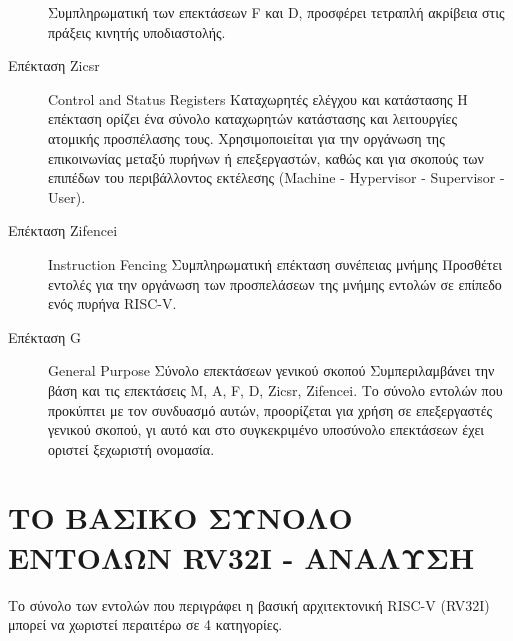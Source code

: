 \documentclass[11pt]{extarticle}
\let\stdsection\section
\renewcommand\section{\newpage\stdsection}
\begin{document}
\begin{description}
Συμπληρωματική των επεκτάσεων F και D, προσφέρει τετραπλή ακρίβεια στις πράξεις κινητής υποδιαστολής.
    \item[Επέκταση Zicsr] Control and Status Registers \newline
Καταχωρητές ελέγχου και κατάστασης \newline
Η επέκταση ορίζει ένα σύνολο καταχωρητών κατάστασης και λειτουργίες ατομικής προσπέλασης τους.
Χρησιμοποιείται για την οργάνωση της επικοινωνίας μεταξύ πυρήνων ή επεξεργαστών, καθώς και για σκοπούς των επιπέδων του περιβάλλοντος εκτέλεσης (Machine - Hypervisor - Supervisor - User).
    \item[Επέκταση Zifencei] Instruction Fencing \newline
    Συμπληρωματική επέκταση συνέπειας μνήμης \newline
Προσθέτει εντολές για την οργάνωση των προσπελάσεων της μνήμης εντολών σε επίπεδο ενός πυρήνα RISC-V.
    \item[Επέκταση G] General Purpose \newline
    Σύνολο επεκτάσεων γενικού σκοπού \newline
Συμπεριλαμβάνει την βάση και τις επεκτάσεις M, A, F, D, Zicsr, Zifencei.
Το σύνολο εντολών που προκύπτει με τον συνδυασμό αυτών, προορίζεται για χρήση σε επεξεργαστές γενικού σκοπού, γι αυτό και στο συγκεκριμένο υποσύνολο επεκτάσεων έχει οριστεί ξεχωριστή ονομασία.
\end{description}

\section{ΤΟ ΒΑΣΙΚΟ ΣΥΝΟΛΟ ΕΝΤΟΛΩΝ RV32I - ΑΝΑΛΥΣΗ}
Το σύνολο των εντολών που περιγράφει η βασική αρχιτεκτονική RISC-V (RV32I) μπορεί να χωριστεί περαιτέρω σε 4 κατηγορίες.
\end{document}
